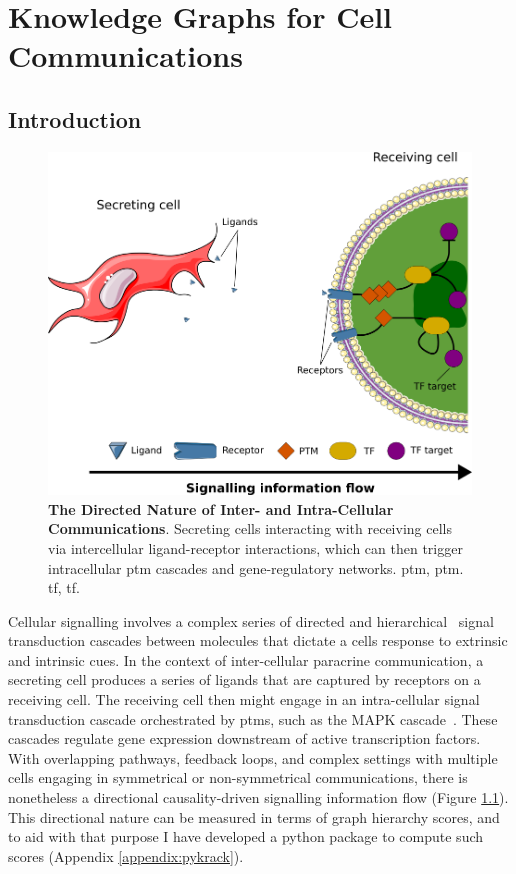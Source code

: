 \chapter{Knowledge Graphs for Cell Communications}
\label{06kg}

\newpage
\section{Introduction}

\begin{figure}[H]
    \centering
    \includegraphics{06kg/figs/6KG_com.png}
    \caption{\textbf{The Directed Nature of Inter- and Intra-Cellular Communications}. Secreting cells interacting with receiving cells via intercellular ligand-receptor interactions, which can then trigger intracellular \acrshort{ptm} cascades and gene-regulatory networks. \acrshort{ptm}, \acrlong{ptm}. \acrshort{tf}, \acrlong{tf}.}
    \label{fig:6intro}
\end{figure}

Cellular signalling involves a complex series of directed and hierarchical~\cite{kumar_3_2003} signal transduction cascades between molecules that dictate a cells response to extrinsic and intrinsic cues. In the context of inter-cellular paracrine communication, a secreting cell produces a series of ligands that are captured by receptors on a receiving cell. The receiving cell then might engage in an intra-cellular signal transduction cascade orchestrated by \acrshort{ptm}s, such as the MAPK cascade~\cite{zhang_mapk_2002}. These cascades regulate gene expression downstream of active transcription factors. With overlapping pathways, feedback loops, and complex settings with multiple cells engaging in symmetrical or non-symmetrical communications, there is nonetheless a directional causality-driven signalling information flow (Figure \ref{fig:6intro}). This directional nature can be measured in terms of graph hierarchy scores, and to aid with that purpose I have developed a python package to compute such scores (Appendix \ref{appendix:pykrack}).


